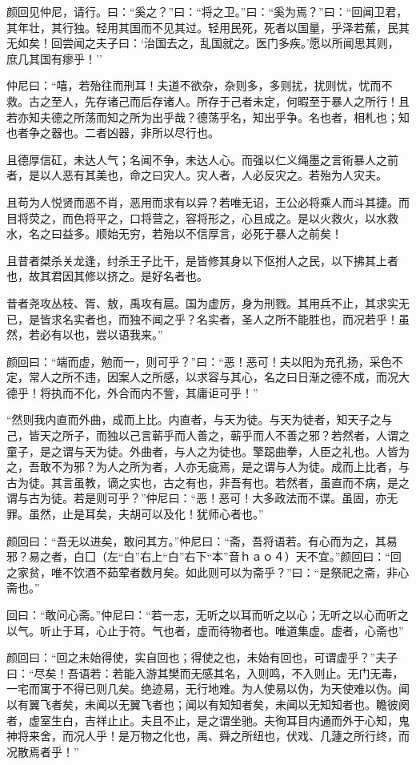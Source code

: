 \documentclass[]{article}
\begin{document}
颜回见仲尼，请行。曰：``奚之？''曰：``将之卫。''曰：``奚为焉？''曰：``回闻卫君，其年壮，其行独。轻用其国而不见其过。轻用民死，死者以国量，乎泽若蕉，民其无如矣！回尝闻之夫子曰：`治国去之，乱国就之。医门多疾。'愿以所闻思其则，庶几其国有瘳乎！''

仲尼曰：``嘻，若殆往而刑耳！夫道不欲杂，杂则多，多则扰，扰则忧，忧而不救。古之至人，先存诸己而后存诸人。所存于己者未定，何暇至于暴人之所行！且若亦知夫德之所荡而知之所为出乎哉？德荡乎名，知出乎争。名也者，相札也；知也者争之器也。二者凶器，非所以尽行也。

且德厚信矼，未达人气；名闻不争，未达人心。而强以仁义绳墨之言術暴人之前者，是以人恶有其美也，命之曰灾人。灾人者，人必反灾之。若殆为人灾夫。

且苟为人悦贤而恶不肖，恶用而求有以异？若唯无诏，王公必将乘人而斗其捷。而目将荧之，而色将平之，口将营之，容将形之，心且成之。是以火救火，以水救水，名之曰益多。顺始无穷，若殆以不信厚言，必死于暴人之前矣！

且昔者桀杀关龙逢，纣杀王子比干，是皆修其身以下伛拊人之民，以下拂其上者也，故其君因其修以挤之。是好名者也。

昔者尧攻丛枝、胥、敖，禹攻有扈。国为虚厉，身为刑戮。其用兵不止，其求实无已，是皆求名实者也，而独不闻之乎？名实者，圣人之所不能胜也，而况若乎！虽然，若必有以也，尝以语我来。''

颜回曰：``端而虚，勉而一，则可乎？''曰：``恶！恶可！夫以阳为充孔扬，采色不定，常人之所不违，因案人之所感，以求容与其心，名之曰日渐之德不成，而况大德乎！将执而不化，外合而内不訾，其庸讵可乎！''

``然则我内直而外曲，成而上比。内直者，与天为徒。与天为徒者，知天子之与己，皆天之所子，而独以己言蕲乎而人善之，蕲乎而人不善之邪？若然者，人谓之童子，是之谓与天为徒。外曲者，与人之为徒也。擎跽曲拳，人臣之礼也。人皆为之，吾敢不为邪？为人之所为者，人亦无疵焉，是之谓与人为徒。成而上比者，与古为徒。其言虽教，谪之实也，古之有也，非吾有也。若然者，虽直而不病，是之谓与古为徒。若是则可乎？''仲尼曰：``恶！恶可！大多政法而不谍。虽固，亦无罪。虽然，止是耳矣，夫胡可以及化！犹师心者也。''

颜回曰：``吾无以进矣，敢问其方。''仲尼曰：``斋，吾将语若。有心而为之，其易邪？易之者，白囗（左``白''右上``白''右下``本''音ｈａｏ４）天不宜。''颜回曰：``回之家贫，唯不饮酒不茹荤者数月矣。如此则可以为斋乎？''曰：``是祭祀之斋，非心斋也。''

回曰：``敢问心斋。''仲尼曰：``若一志，无听之以耳而听之以心；无听之以心而听之以气。听止于耳，心止于符。气也者，虚而待物者也。唯道集虚。虚者，心斋也''

颜回曰：``回之未始得使，实自回也；得使之也，未始有回也，可谓虚乎？''夫子曰：``尽矣！吾语若：若能入游其樊而无感其名，入则鸣，不入则止。无门无毒，一宅而寓于不得已则几矣。绝迹易，无行地难。为人使易以伪，为天使难以伪。闻以有翼飞者矣，未闻以无翼飞者也；闻以有知知者矣，未闻以无知知者也。瞻彼阕者，虚室生白，吉祥止止。夫且不止，是之谓坐驰。夫徇耳目内通而外于心知，鬼神将来舍，而况人乎！是万物之化也，禹、舜之所纽也，伏戏、几蘧之所行终，而况散焉者乎！''
\end{document}
